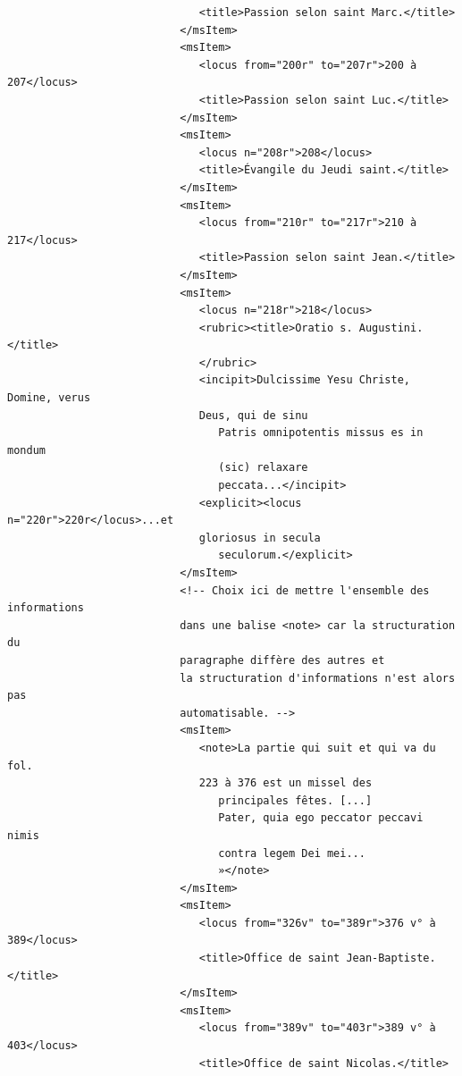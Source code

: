 \documentclass[a4paper,12pt,twoside]{book}
\begin{document}
\begin{verbatim}
                              <title>Passion selon saint Marc.</title>
                           </msItem>
                           <msItem>
                              <locus from="200r" to="207r">200 à 207</locus>
                              <title>Passion selon saint Luc.</title>
                           </msItem>
                           <msItem>
                              <locus n="208r">208</locus>
                              <title>Évangile du Jeudi saint.</title>
                           </msItem>
                           <msItem>
                              <locus from="210r" to="217r">210 à 217</locus>
                              <title>Passion selon saint Jean.</title>
                           </msItem>
                           <msItem>
                              <locus n="218r">218</locus>
                              <rubric><title>Oratio s. Augustini.</title>
                              </rubric>
                              <incipit>Dulcissime Yesu Christe, Domine, verus 
                              Deus, qui de sinu
                                 Patris omnipotentis missus es in mondum 
                                 (sic) relaxare
                                 peccata...</incipit>
                              <explicit><locus n="220r">220r</locus>...et 
                              gloriosus in secula
                                 seculorum.</explicit>
                           </msItem>
                           <!-- Choix ici de mettre l'ensemble des informations
                           dans une balise <note> car la structuration du 
                           paragraphe diffère des autres et
                           la structuration d'informations n'est alors pas 
                           automatisable. -->
                           <msItem>
                              <note>La partie qui suit et qui va du fol. 
                              223 à 376 est un missel des
                                 principales fêtes. [...]
                                 Pater, quia ego pecca­tor peccavi nimis 
                                 contra legem Dei mei...
                                 »</note>
                           </msItem>
                           <msItem>
                              <locus from="326v" to="389r">376 v° à 389</locus>
                              <title>Office de saint Jean-Baptiste.</title>
                           </msItem>
                           <msItem>
                              <locus from="389v" to="403r">389 v° à 403</locus>
                              <title>Office de saint Nicolas.</title>

\end{verbatim}
\end{document}
